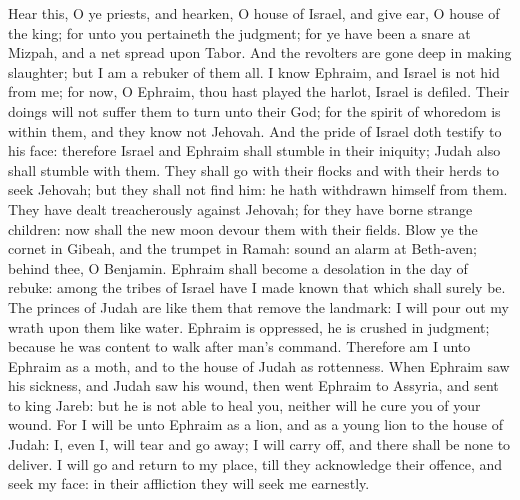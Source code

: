 Hear this, O ye priests, and hearken, O house of Israel, and give ear, O house of the king; for unto you pertaineth the judgment; for ye have been a snare at Mizpah, and a net spread upon Tabor. And the revolters are gone deep in making slaughter; but I am a rebuker of them all. I know Ephraim, and Israel is not hid from me; for now, O Ephraim, thou hast played the harlot, Israel is defiled. Their doings will not suffer them to turn unto their God; for the spirit of whoredom is within them, and they know not Jehovah. And the pride of Israel doth testify to his face: therefore Israel and Ephraim shall stumble in their iniquity; Judah also shall stumble with them. They shall go with their flocks and with their herds to seek Jehovah; but they shall not find him: he hath withdrawn himself from them. They have dealt treacherously against Jehovah; for they have borne strange children: now shall the new moon devour them with their fields.  Blow ye the cornet in Gibeah, and the trumpet in Ramah: sound an alarm at Beth-aven; behind thee, O Benjamin. Ephraim shall become a desolation in the day of rebuke: among the tribes of Israel have I made known that which shall surely be. The princes of Judah are like them that remove the landmark: I will pour out my wrath upon them like water. Ephraim is oppressed, he is crushed in judgment; because he was content to walk after man’s command. Therefore am I unto Ephraim as a moth, and to the house of Judah as rottenness. When Ephraim saw his sickness, and Judah saw his wound, then went Ephraim to Assyria, and sent to king Jareb: but he is not able to heal you, neither will he cure you of your wound. For I will be unto Ephraim as a lion, and as a young lion to the house of Judah: I, even I, will tear and go away; I will carry off, and there shall be none to deliver. I will go and return to my place, till they acknowledge their offence, and seek my face: in their affliction they will seek me earnestly. 

